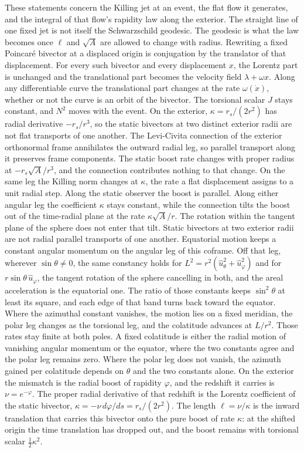 \documentclass[a4paper]{article}
\begin{document}
These statements concern the Killing jet at an event, the flat flow it generates, and the integral of that flow's rapidity law along the exterior. The straight line of one fixed jet is not itself the Schwarzschild geodesic. The geodesic is what the law becomes once \(\ell\) and \(\sqrt{A}\) are allowed to change with radius. Rewriting a fixed Poincar\'{e} bivector at a displaced origin is conjugation by the translator of that displacement. For every such bivector and every displacement \(x\), the Lorentz part is unchanged and the translational part becomes the velocity field \(\lambda+\omega x\). Along any differentiable curve the translational part changes at the rate \(\omega(\dot{x})\), whether or not the curve is an orbit of the bivector. The torsional scalar \(J\) stays constant, and \(N^{2}\) moves with the event. On the exterior, \(\kappa=r_{s}/(2r^{2})\) has radial derivative \(-r_{s}/r^{3}\), so the static bivectors at two distinct exterior radii are not flat transports of one another. The Levi-Civita connection of the exterior orthonormal frame annihilates the outward radial leg, so parallel transport along it preserves frame components. The static boost rate changes with proper radius at \(-r_{s}\sqrt{A}/r^{3}\), and the connection contributes nothing to that change. On the same leg the Killing norm changes at \(\kappa\), the rate a flat displacement assigns to a unit radial step. Along the static observer the boost is parallel. Along either angular leg the coefficient \(\kappa\) stays constant, while the connection tilts the boost out of the time-radial plane at the rate \(\kappa\sqrt{A}/r\). The rotation within the tangent plane of the sphere does not enter that tilt. Static bivectors at two exterior radii are not radial parallel transports of one another.  Equatorial motion keeps a constant angular momentum on the angular leg of this coframe. Off that leg, wherever \(\sin\theta\neq 0\), the same constancy holds for \(L^{2}=r^{2}(\hat{u}_{\theta}^{2}+\hat{u}_{\varphi}^{2})\) and for \(r\sin\theta\,\hat{u}_{\varphi}\), the tangent rotation of the sphere cancelling in both, and the areal acceleration is the equatorial one. The ratio of those constants keeps \(\sin^{2}\theta\) at least its square, and each edge of that band turns back toward the equator. Where the azimuthal constant vanishes, the motion lies on a fixed meridian, the polar leg changes as the torsional leg, and the colatitude advances at \(L/r^{2}\). Those rates stay finite at both poles. A fixed colatitude is either the radial motion of vanishing angular momentum or the equator, where the two constants agree and the polar leg remains zero. Where the polar leg does not vanish, the azimuth gained per colatitude depends on \(\theta\) and the two constants alone. On the exterior the mismatch is the radial boost of rapidity \(\varphi\), and the redshift it carries is \(\nu=e^{-\varphi}\). The proper radial derivative of that redshift is the Lorentz coefficient of the static bivector, \(\kappa=-\nu\,d\varphi/ds=r_{s}/(2r^{2})\). The length \(\ell=\nu/\kappa\) is the inward translation that carries this bivector onto the pure boost of rate \(\kappa\): at the shifted origin the time translation has dropped out, and the boost remains with torsional scalar \(\tfrac12\kappa^{2}\).
\end{document}
